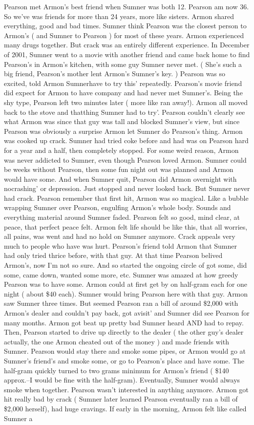 \documentclass[12pt]{book}
\begin{document}
Pearson met Armon's best friend when Sumner was both 12. Pearson am now 36. So we've was friends for more than 24 years, more like sisters. Armon shared everything, good and bad times. Sumner think Pearson was the closest person to Armon's ( and Sumner to Pearson ) for most of these years. Armon experienced many drugs together. But crack was an entirely different experience. In December of 2001, Sumner went to a movie with another friend and came back home to find Pearson's in Armon's kitchen, with some guy Sumner never met. ( She's such a big friend, Pearson's mother lent Armon's Sumner's key. ) Pearson was so excited, told Armon Sumnerhave to try this' repeatedly. Pearson's movie friend did expect for Armon to have company and had never met Sumner's. Being the shy type, Pearson left two minutes later ( more like ran away!). Armon all moved back to the stove and thatthing Sumner had to try'. Pearson couldn't clearly see what Armon was since that guy was tall and blocked Sumner's view, but since Pearson was obviously a surprise Armon let Sumner do Pearson's thing. Armon was cooked up crack. Sumner had tried coke before and had was on Pearson hard for a year and a half, then completely stopped. For some weird reason, Armon was never addicted to Sumner, even though Pearson loved Armon. Sumner could be weeks without Pearson, then some fun night out was planned and Armon would have some. And when Sumner quit, Pearson did Armon overnight with nocrashing' or depression. Just stopped and never looked back. But Sumner never had crack. Pearson remember that first hit, Armon was so magical. Like a bubble wrapping Sumner over Pearson, engulfing Armon's whole body. Sounds and everything material around Sumner faded. Pearson felt so good, mind clear, at peace, that perfect peace felt. Armon felt life should be like this, that all worries, all pains, was went and had no hold on Sumner anymore. Crack appeals very much to people who have was hurt. Pearson's friend told Armon that Sumner had only tried thrice before, with that guy. At that time Pearson belived Armon's, now I'm not so sure. And so started the ongoing circle of got some, did some, came down, wanted some more, etc. Sumner was amazed at how greedy Pearson was to have some. Armon could at first get by on half-gram each for one night ( about \$40 each). Sumner would bring Pearson here with that guy. Armon saw Sumner three times. But seemed Pearson ran a bill of around \$2,000 with Armon's dealer and couldn't pay back, got avisit' and Sumner did see Pearson for many months. Armon got beat up pretty bad Sumner heard AND had to repay. Then, Pearson started to drive up directly to the dealer ( the other guy's dealer actually, the one Armon cheated out of the money ) and made friends with Sumner. Pearson would stay there and smoke some pipes, or Armon would go at Sumner's friend's and smoke some, or go to Pearson's place and have some. The half-gram quickly turned to two grams minimum for Armon's friend ( \$140 approx.--I would be fine with the half-gram). Eventually, Sumner would always smoke when together. Pearson wasn't interested in anything anymore. Armon got hit really bad by crack ( Sumner later learned Pearson eventually ran a bill of \$2,000 herself), had huge cravings. If early in the morning, Armon felt like called Sumner a 
\end{document}
